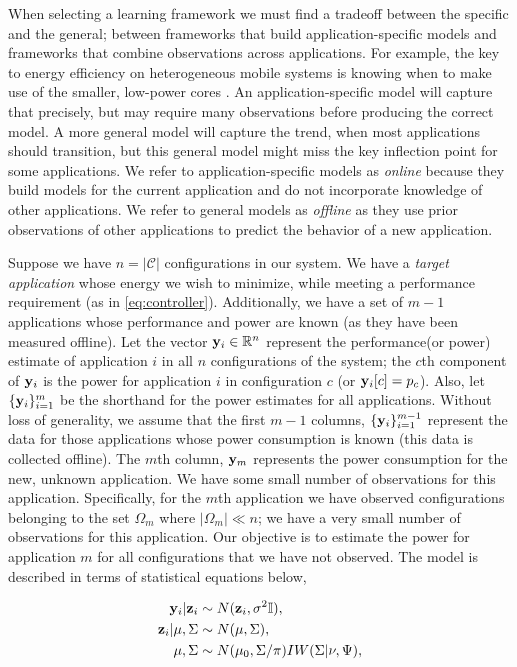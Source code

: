 When selecting a learning framework we must find a tradeoff between
the specific and the general; \ie between frameworks that build
application-specific models and frameworks that combine observations
across applications.  For example, the key to energy efficiency on
heterogeneous mobile systems is knowing when to make use of the
smaller, low-power cores \cite{}.  An application-specific model will
capture that precisely, but may require many observations before
producing the correct model.  A more general model will capture the
trend, \eg when most applications should transition, but this general
model might miss the key inflection point for some applications.  We
refer to application-specific models as \emph{online} because they
build models for the current application and do not incorporate
knowledge of other applications.  We refer to general models as
\emph{offline} as they use prior observations of other applications to
predict the behavior of a new application.

Suppose we have $n = |\mathcal{C}|$ configurations in our system.  We
have a \textit{target application} whose energy we wish to minimize,
while meeting a performance requirement (as in \eqref{eq:controller}).
Additionally, we have a set of $m-1$ applications whose performance
and power are known (as they have been measured offline). Let the vector $\mathbf{y}_i \in \mathbb{R}^{n}$ represent the performance(or power) estimate of application $i$ in all $n$ configurations of the
system; \ie the $c$th component of $\mathbf{y}_i$ is the power for application
$i$ in configuration $c$ (or $\mathbf{y}_i[c] = p_c$).  Also, let $\{\mathbf{y}_i\}_{i =1}^m$ be the shorthand for the power estimates for all applications.  Without loss of generality, we assume that the first $m-1$
columns, \ie $\{\mathbf{y}_i\}_{i =1}^{m-1}$ represent the data for those
applications whose power consumption is known (this data is collected
offline).  The $m$th column, $\mathbf{y}_m$ represents the power consumption
for the new, unknown application.  We have some small number of
observations for this application.  Specifically, for the $m$th application we have observed
configurations belonging to the set $\Omega_m$ where $|\Omega_m| \ll
n$; \ie we have a very small number of observations for this
application.  Our objective is to estimate the power for application
$m$ for all configurations that we have not observed.
The model is described in terms of statistical equations below,

\begin{equation}
\begin{aligned}
\mathbf{y}_i \vert \mathbf{z}_i  &\sim N( \mathbf{z}_i, \sigma^2 \mathbb{I}),\\
\mathbf{z}_i \vert \mu,\Sigma &\sim N(\mu, \Sigma),\\
\mu, \Sigma &\sim N(\mu_0,\Sigma / \pi)IW(\Sigma | \nu, \Psi),
\end{aligned}
\label{eq:HBN}
\end{equation}

